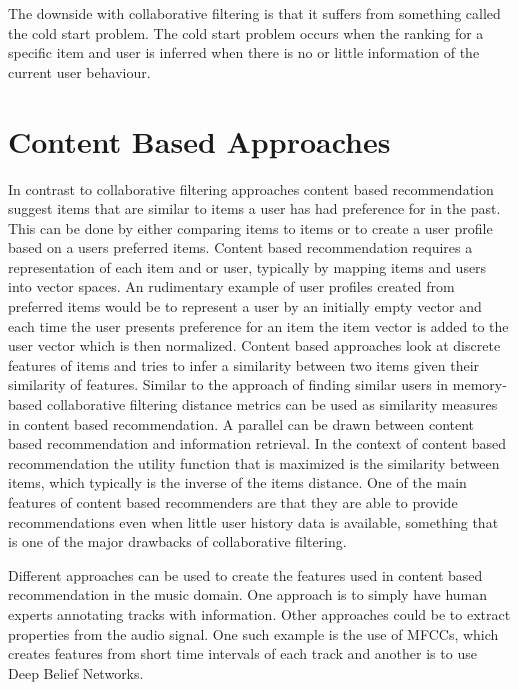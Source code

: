 \documentclass[a4paper,11pt]{kth-mag}
\begin{document}
The downside with collaborative filtering is that it suffers from something called the cold start problem. The cold start problem occurs when the ranking for a specific item and user is inferred when there is no or little information of the current user behaviour\cite{herlocker2004evaluating}.

\section{Content Based Approaches}
In contrast to collaborative filtering approaches content based recommendation suggest items that are similar to items  a user has had preference for in the past. This can be done by either comparing items to items or to create a user profile based on a users preferred items\cite{adomavicius2005toward}. Content based recommendation requires a representation of each item and or user, typically by mapping items and users into vector spaces. An rudimentary example of user profiles created from preferred items would be to represent a user by an initially empty vector and each time the user presents preference for an item the item vector is added to the user vector which is then normalized. Content based approaches look at discrete features of items and tries to infer a similarity between two items given their similarity of features. Similar to the approach of finding similar users in memory-based collaborative filtering distance metrics can be used as similarity measures in content based recommendation. A parallel can be drawn between content based recommendation and information retrieval. In the context of content based recommendation the utility function that is maximized is the similarity between items, which typically is the inverse of the items distance\cite{adomavicius2005toward}. One of the main features of content based recommenders are that they are able to provide recommendations even when little user history data is available, something that is one of the major drawbacks of collaborative filtering\cite{gunawardana2009unified}.

Different approaches can be used to create the features used in content based recommendation in the music domain. One approach is to simply have human experts annotating tracks with information\cite{musicGenome}\cite{tzanetakis2002musical}. Other approaches could be to extract properties from the audio signal. One such example is the use of MFCCs, which creates features from short time intervals of each track\cite{logan2000mel} and another is to use Deep Belief Networks\cite{hamel2010learning}.
\end{document}
